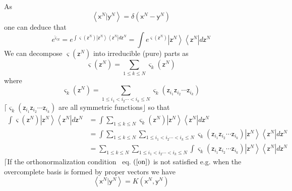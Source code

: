 \documentclass[aps,preprint]{revtex4}%
\begin{document}
\bigskip As
\begin{equation}
\left\langle \mathsf{x}^{N}|\mathsf{y}^{N}\right\rangle =\delta\left(
\mathsf{x}^{N}-\mathsf{y}^{N}\right)  \label{on}%
\end{equation}
one can deduce that
\begin{equation}
e^{\breve{\varsigma}_{N}}=e^{\int\varsigma\left(  \mathsf{z}^{N}\right)
\left|  \mathsf{z}^{N}\right\rangle \left\langle \mathsf{z}^{N}\right|
d\mathsf{z}^{N}}=\int e^{\varsigma\left(  \mathsf{z}^{N}\right)  }\left|
\mathsf{z}^{N}\right\rangle \left\langle \mathsf{z}^{N}\right|  d\mathsf{z}%
^{N}%
\end{equation}
We can decompose $\varsigma\left(  \mathsf{z}^{N}\right)  $ into irreducible
(pure) parts as
\begin{equation}
\varsigma\left(  \mathsf{z}^{N}\right)  =\sum_{1\leq k\leq N}\varsigma
_{k}\left(  \mathsf{z}^{N}\right)
\end{equation}
where
\begin{equation}
\varsigma_{k}\left(  \mathsf{z}^{N}\right)  =\sum_{1\leq i_{1}<i_{2}%
\cdots<i_{k}\leq N}\varsigma_{k}\left(  \mathsf{z}_{i_{1}}\mathsf{z}_{i_{2}%
}\cdots\mathsf{z}_{i_{k}}\right)
\end{equation}
$\lceil\varsigma_{k}\left(  \mathsf{z}_{i_{1}}\mathsf{z}_{i_{2}}%
\cdots\mathsf{z}_{i_{k}}\right)  $ are all symmetric functions$\rfloor$ so
that
\begin{align}
\int\varsigma\left(  \mathsf{z}^{N}\right)  \left|  \mathsf{z}^{N}%
\right\rangle \left\langle \mathsf{z}^{N}\right|  d\mathsf{z}^{N}  &
=\int\sum_{1\leq k\leq N}\varsigma_{k}\left(  \mathsf{z}^{N}\right)  \left|
\mathsf{z}^{N}\right\rangle \left\langle \mathsf{z}^{N}\right|  d\mathsf{z}%
^{N}\nonumber\\
&  =\int\sum_{1\leq k\leq N}\sum_{1\leq i_{1}<i_{2}\cdots<i_{k}\leq
N}\varsigma_{k}\left(  \mathsf{z}_{i_{1}}\mathsf{z}_{i_{2}}\cdots
\mathsf{z}_{i_{k}}\right)  \left|  \mathsf{z}^{N}\right\rangle \left\langle
\mathsf{z}^{N}\right|  d\mathsf{z}^{N}\nonumber\\
&  =\sum_{1\leq k\leq N}\sum_{1\leq i_{1}<i_{2}\cdots<i_{k}\leq N}%
\int\varsigma_{k}\left(  \mathsf{z}_{i_{1}}\mathsf{z}_{i_{2}}\cdots
\mathsf{z}_{i_{k}}\right)  \left|  \mathsf{z}^{N}\right\rangle \left\langle
\mathsf{z}^{N}\right|  d\mathsf{z}^{N}%
\end{align}
$\lceil$If the orthonormalization condition \ eq. $\left(  \ref{on}\right)  $
is not satisfied e.g. when the overcomplete basis is formed by proper vectors
we have
\begin{equation}
\left\langle \mathsf{x}^{N}|\mathsf{y}^{N}\right\rangle =K\left(
\mathsf{x}^{N},\mathsf{y}^{N}\right)
\end{equation}
\end{document}
